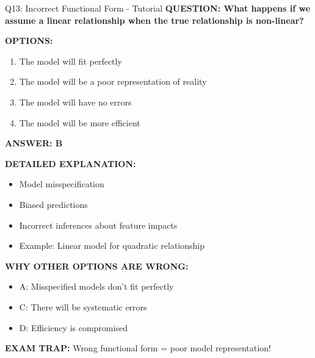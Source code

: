 \documentclass[8pt]{beamer}
\begin{document}
	\begin{frame}{Q13: Incorrect Functional Form - Tutorial}
		\fontsize{6.5}{7.5}\selectfont
		\textbf{QUESTION: What happens if we assume a linear relationship when the true relationship is non-linear?}
		
		\vspace{0.1cm}
		\textbf{OPTIONS:}
		\begin{enumerate}
			\item The model will fit perfectly
			\item The model will be a poor representation of reality
			\item The model will have no errors
			\item The model will be more efficient
		\end{enumerate}
		
		\vspace{0.1cm}
		\textcolor{myblue}{\textbf{ANSWER: B}}
		
		\vspace{0.1cm}
		\textbf{DETAILED EXPLANATION:}
		\begin{itemize}
			\item Model misspecification
			\item Biased predictions
			\item Incorrect inferences about feature impacts
			\item Example: Linear model for quadratic relationship
		\end{itemize}
		
		\vspace{0.1cm}
		\textcolor{myred}{\textbf{WHY OTHER OPTIONS ARE WRONG:}}
		\begin{itemize}
			\item \textcolor{myred}{A:} Misspecified models don't fit perfectly
			\item \textcolor{myred}{C:} There will be systematic errors
			\item \textcolor{myred}{D:} Efficiency is compromised
		\end{itemize}
		
		\textcolor{myred}{\textbf{EXAM TRAP:}} Wrong functional form = \textcolor{myblue}{poor model representation}!
	\end{frame}
	
\end{document}
